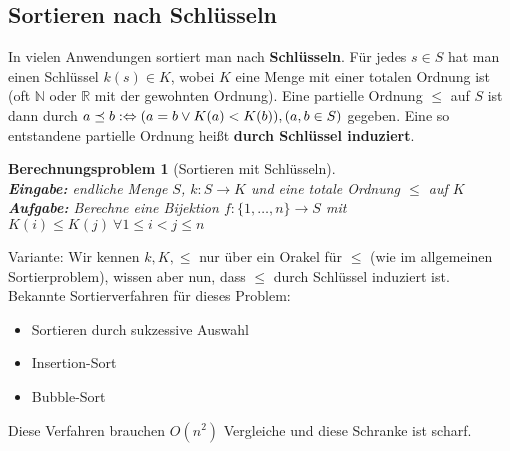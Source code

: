 \documentclass[12pt,a4paper]{article}
\theoremstyle{plain}
\newtheorem{Berechnungsproblem}[Theorem]{Berechnungsproblem}
\newcommand{\N}{\mathbb{N}}
\newcommand{\R}{\mathbb{R}}
\numberwithin{equation}{section}
\begin{document}
\subsection{Sortieren nach Schlüsseln}
In vielen Anwendungen sortiert man nach \textbf{Schlüsseln}. Für jedes $s\in S$ hat man einen Schlüssel $k(s)\in K$, wobei $K$ eine Menge mit einer totalen Ordnung ist (oft $\N$ oder $\R$ mit der gewohnten Ordnung). Eine partielle Ordnung $\leq$ auf $S$ ist dann durch $a\preceq b :\Leftrightarrow \\(a=b \vee K(a) < K(b)), (a,b\in S)$ gegeben. Eine so entstandene partielle Ordnung heißt \textbf{durch Schlüssel induziert}.
\begin{Berechnungsproblem}[Sortieren mit Schlüsseln]\\
\textbf{Eingabe:} endliche Menge $S$, $k: S \rightarrow K$ und eine totale Ordnung $\leq$ auf $K$\\
\textbf{Aufgabe:} Berechne eine Bijektion $f:\{1,\ldots,n\} \rightarrow S$ mit $K(i)\leq K(j)\ \forall 1\leq i < j\leq n$ 
\end{Berechnungsproblem}
Variante: Wir kennen $k, K, \leq$ nur über ein Orakel für $\leq$ (wie im allgemeinen Sortierproblem), wissen aber nun, dass $\leq$ durch Schlüssel induziert ist.\\
Bekannte Sortierverfahren für dieses Problem:
\begin{itemize}
\item Sortieren durch sukzessive Auswahl
\item Insertion-Sort
\item Bubble-Sort
\end{itemize}
Diese Verfahren brauchen $O(n^2)$ Vergleiche und diese Schranke ist scharf.
\end{document}
